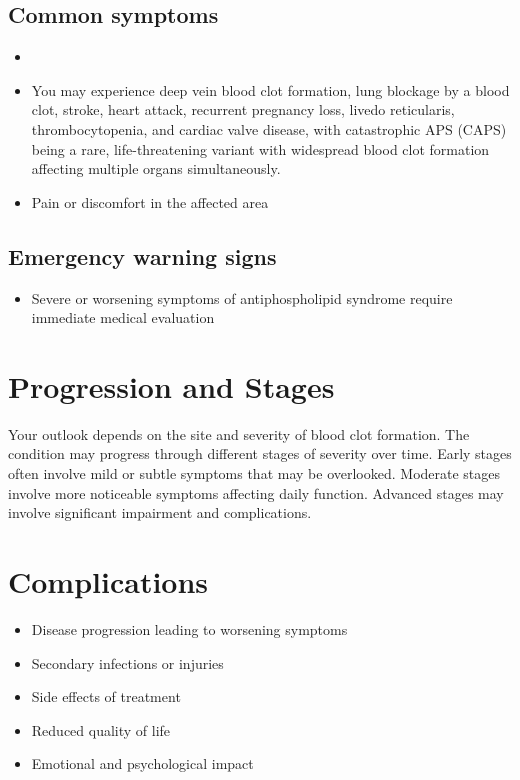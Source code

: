 \subsection{Common symptoms}
\begin{itemize}[noitemsep]
  \item \item You may experience deep vein blood clot formation, lung blockage by a blood clot, stroke, heart attack, recurrent pregnancy loss, livedo reticularis, thrombocytopenia, and cardiac valve disease, with catastrophic APS (CAPS) being a rare, life-threatening variant with widespread blood clot formation affecting multiple organs simultaneously.

  \item Pain or discomfort in the affected area
  \end{itemize}

\subsection{Emergency warning signs}
\begin{itemize}[noitemsep]
  \item Severe or worsening symptoms of antiphospholipid syndrome require immediate medical evaluation
\end{itemize}
\section{Progression and Stages}
Your outlook depends on the site and severity of blood clot formation. The condition may progress through different stages of severity over time. Early stages often involve mild or subtle symptoms that may be overlooked. Moderate stages involve more noticeable symptoms affecting daily function. Advanced stages may involve significant impairment and complications.
\section{Complications}
\begin{itemize}[noitemsep]
  \item Disease progression leading to worsening symptoms
  \item Secondary infections or injuries
  \item Side effects of treatment
  \item Reduced quality of life
  \item Emotional and psychological impact
\end{itemize}
